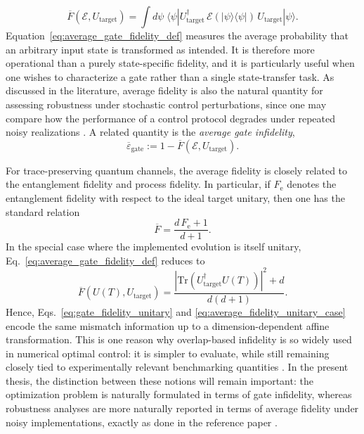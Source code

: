 \begin{equation}
\overline{F}\!\left(\mathcal{E},U_{\mathrm{target}}\right)
=
\int d\psi\;
\langle \psi |
U_{\mathrm{target}}^{\dagger}\,
\mathcal{E}\!\left(|\psi\rangle\langle\psi|\right)\,
U_{\mathrm{target}}
|\psi\rangle.
\label{eq:average_gate_fidelity_def}
\end{equation}
Equation~\eqref{eq:average_gate_fidelity_def} measures the average probability that an arbitrary input state is transformed as intended. It is therefore more operational than a purely state-specific fidelity, and it is particularly useful when one wishes to characterize a gate rather than a single state-transfer task. As discussed in the literature, average fidelity is also the natural quantity for assessing robustness under stochastic control perturbations, since one may compare how the performance of a control protocol degrades under repeated noisy realizations \cite{Niu2019}. A related quantity is the \emph{average gate infidelity},
\begin{equation}
\overline{\varepsilon}_{\mathrm{gate}}
:=
1-\overline{F}\!\left(\mathcal{E},U_{\mathrm{target}}\right).
\label{eq:average_gate_infidelity}
\end{equation}

For trace-preserving quantum channels, the average fidelity is closely related to the entanglement fidelity and process fidelity. In particular, if $F_{\mathrm{e}}$ denotes the entanglement fidelity with respect to the ideal target unitary, then one has the standard relation
\begin{equation}
\overline{F}
=
\frac{d\,F_{\mathrm{e}}+1}{d+1}.
\label{eq:avg_fidelity_entanglement_relation}
\end{equation}
In the special case where the implemented evolution is itself unitary, Eq.~\eqref{eq:average_gate_fidelity_def} reduces to
\begin{equation}
\overline{F}\!\left(U(T),U_{\mathrm{target}}\right)
=
\frac{
\left|
\mathrm{Tr}\!\left(U_{\mathrm{target}}^{\dagger}U(T)\right)
\right|^{2}
+d
}{
d(d+1)
}.
\label{eq:average_fidelity_unitary_case}
\end{equation}
Hence, Eqs.~\eqref{eq:gate_fidelity_unitary} and \eqref{eq:average_fidelity_unitary_case} encode the same mismatch information up to a dimension-dependent affine transformation. This is one reason why overlap-based infidelity is so widely used in numerical optimal control: it is simpler to evaluate, while still remaining closely tied to experimentally relevant benchmarking quantities \cite{Nielsen2002,Pedersen2007}. In the present thesis, the distinction between these notions will remain important: the optimization problem is naturally formulated in terms of gate infidelity, whereas robustness analyses are more naturally reported in terms of average fidelity under noisy implementations, exactly as done in the reference paper \cite{Niu2019}.

